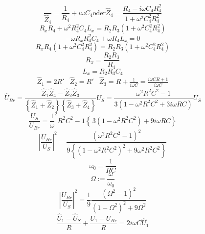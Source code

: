 \begin{equation}
\frac{}{\hat{Z}_4}=\frac{1}{R_4}+i\omega C_4 \text{oder}
\hat{Z}_4=\frac{R_4-i\omega C_4 R^2_4}{1+\omega^2 C^2_4 R^2_4}
\end{equation}
\begin{equation}
R_xR_4+\omega^2 R^2_4 C_4 L_x = R_2 R_3 \left(1+\omega^2 C^2_4 R^2_4 \right)
\end{equation}
\begin{equation}
-\omega R_x R^2_4 C_4 + \omega R_4 L_x=0
\end{equation}
\begin{equation}
R_xR_4\left(1+\omega^2 C^2_4 R^2_4 \right) =R_2 R_3 \left(1+\omega^2 C^2_4 R^2_4 \right)
\end{equation}
\begin{equation}
R_x= \frac{R_2 R_3}{R_4}
\end{equation}
\begin{equation}
L_x=R_2 R_3 C_4
\end{equation}
\begin{align}
\hat{Z}_1=2R' & \hat{Z}_2=R' &
\hat{Z}_3=R + \frac{1}{i \omega C}=\frac{i\omega C R + 1}{i \omega C}
\end{align}
\begin{equation}
\hat{U}_ {Br}=\frac{\hat{Z}_1\hat{Z}_4-\hat{Z}_2\hat{Z}_3}
{\left\{\hat{Z}_1+\hat{Z}_2 \right\}\left\{\hat{Z}_3 + \hat{Z}_4 \right\}}U_S
=\frac{\omega^2R^2C^2-1}{3(1-\omega^2 R^2 C^2+3i\omega RC)}U_S
\end{equation}
\begin{equation}
\frac{U_S}{U_{Br}}=\frac{1}{\omega}^2R^2C^2-1\left\{\,3(1-\omega^2 R^2 C^2)
+9i\omega RC \right\}
\end{equation}
\begin{equation}
\left|\frac{U_{Br}}{U_S}\right|^2=\frac{(\omega^2R^2C^2-1)^2}
{9\left\{(1-\omega^2 R^2 C^2)^2+9\omega^2R^2C^2\right\}}
\end{equation}
\begin{equation}
\omega_0=\frac{1}{RC}
\end{equation}
\begin{equation}
\Omega:=\frac{\omega}{\omega_0}
\end{equation}
\begin{equation}
\left|\frac{U_{Br}}{U_S}\right|^2=\frac{1}{9}\frac{(\Omega^2-1)^2}
{(1-\Omega^2)^2+9\Omega^2}
\end{equation}
\begin{equation}
\frac{\hat{U}_1-\hat{U}_S}{R}+\frac{U_1-U_{Br}}{R}=2i\omega C \hat{U}_1
\end{equation}
